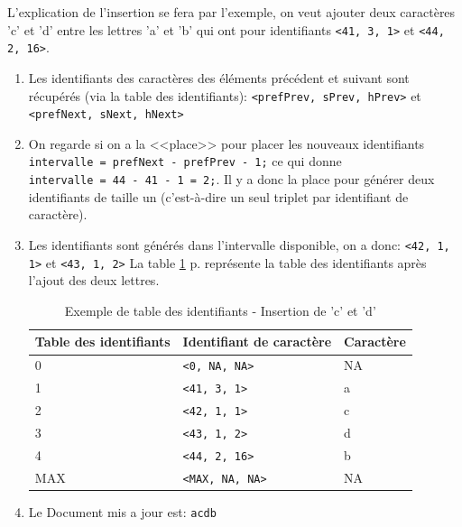 		L'explication de l'insertion se fera par l'exemple, on veut ajouter deux
		caractères 'c' et 'd' entre les lettres 'a' et 'b' qui ont pour
		identifiants \verb+<41, 3, 1>+ et \verb+<44, 2, 16>+.
		\begin{enumerate}
			\item Les identifiants des caractères des éléments précédent et
			suivant sont récupérés (via la table des identifiants):
			\verb+<prefPrev, sPrev, hPrev>+ et \verb+<prefNext, sNext, hNext>+
			\item On regarde si on a la <<place>> pour placer les nouveaux
			identifiants\\ \verb+intervalle = prefNext - prefPrev - 1;+ ce qui
			donne\\ \verb+intervalle = 44 - 41 - 1 = 2;+. Il y a donc la place
			pour générer deux identifiants de taille un (c'est-à-dire un seul
			triplet	par	identifiant de caractère).
			\item Les identifiants sont générés dans l'intervalle disponible, on a
			donc: \verb+<42, 1, 1>+ et \verb+<43, 1, 2>+
			La table \ref{tab:tableID_cd} p.\pageref{tab:tableID_cd} représente
			la table des identifiants après l'ajout des deux lettres.
				
		\begin{table}
			\center
			\begin{tabular}{|l|l|l|}			
			\hline
				Table des identifiants & Identifiant de caractère & Caractère\\
			\hline
				0 & \verb+<0, NA, NA>+ & NA\\
				1 & \verb+<41, 3, 1>+ & a\\
				2 & \verb+<42, 1, 1>+ & c\\
				3 & \verb+<43, 1, 2>+ & d\\
				4 & \verb+<44, 2, 16>+ & b\\
				MAX & \verb+<MAX, NA, NA>+ & NA\\
			\hline
			\end{tabular}
			\caption{Exemple de table des identifiants - Insertion de 'c' et
			'd'}
			\label{tab:tableID_cd}
		\end{table}
			\item Le Document mis a jour est:
				\verb+acdb+
		\end{enumerate}~
		
